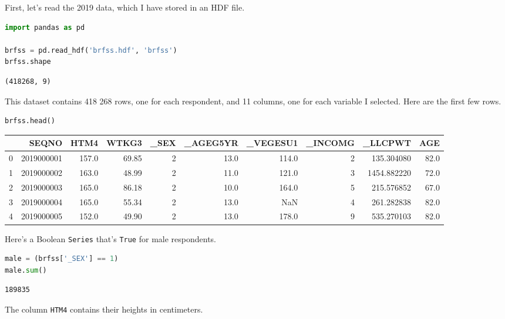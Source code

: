 First, let's read the 2019 data, which I have stored in an HDF file.

\begin{lstlisting}[language=Python]
import pandas as pd

brfss = pd.read_hdf('brfss.hdf', 'brfss')
brfss.shape
\end{lstlisting}

\begin{lstlisting}[]
(418268, 9)
\end{lstlisting}

This dataset contains 418 268 rows, one for each respondent, and 11
columns, one for each variable I selected. Here are the first few rows.

\begin{lstlisting}[language=Python]
brfss.head()
\end{lstlisting}

\begin{tabular}{lrrrrrrrrr}
\toprule
{} &       SEQNO &   HTM4 &  WTKG3 &  \_SEX &  \_AGEG5YR &  \_VEGESU1 &  \_INCOMG &      \_LLCPWT &   AGE \\
\midrule
0 &  2019000001 &  157.0 &  69.85 &     2 &      13.0 &     114.0 &        2 &   135.304080 &  82.0 \\
1 &  2019000002 &  163.0 &  48.99 &     2 &      11.0 &     121.0 &        3 &  1454.882220 &  72.0 \\
2 &  2019000003 &  165.0 &  86.18 &     2 &      10.0 &     164.0 &        5 &   215.576852 &  67.0 \\
3 &  2019000004 &  165.0 &  55.34 &     2 &      13.0 &       NaN &        4 &   261.282838 &  82.0 \\
4 &  2019000005 &  152.0 &  49.90 &     2 &      13.0 &     178.0 &        9 &   535.270103 &  82.0 \\
\bottomrule
\end{tabular}

Here's a Boolean \passthrough{\lstinline!Series!} that's
\passthrough{\lstinline!True!} for male respondents.

\begin{lstlisting}[language=Python]
male = (brfss['_SEX'] == 1)
male.sum()
\end{lstlisting}

\begin{lstlisting}[]
189835
\end{lstlisting}

The column \passthrough{\lstinline!HTM4!} contains their heights in
centimeters.

